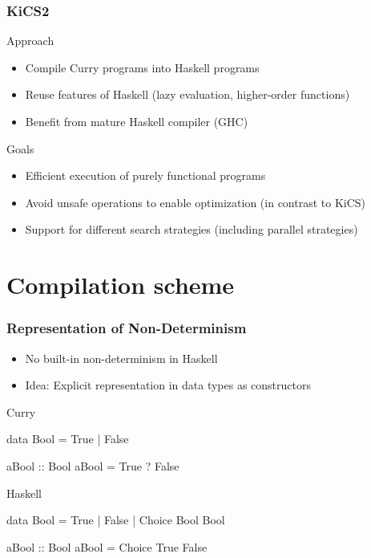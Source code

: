 \documentclass[utf8]{beamer}
\newenvironment{program}{\begin{semiverbatim}\small}{\end{semiverbatim}}
\begin{document}
\begin{frame}
\frametitle{KiCS2}
\begin{block}{Approach}
\begin{itemize}
\item Compile Curry programs into Haskell programs
\item Reuse features of Haskell (lazy evaluation, higher-order functions)
\item Benefit from mature Haskell compiler (GHC)
\end{itemize}
\end{block}
\pause
\begin{block}{Goals}
\begin{itemize}
\item Efficient execution of purely functional programs
\item Avoid unsafe operations to enable optimization (in contrast to KiCS)
\item Support for different search strategies (including parallel strategies)
\end{itemize}
\end{block}
\end{frame}

\section{Compilation scheme}

\begin{frame}[fragile]
\frametitle{Representation of Non-Determinism}
\begin{itemize}
  \item No built-in non-determinism in Haskell
  \item Idea: Explicit representation in data types as constructors
\end{itemize}
\pause
\begin{block}{Curry}
\begin{program}
data Bool = True | False

aBool :: Bool
aBool = True ? False
\end{program}
\end{block}

\begin{block}{Haskell}
\begin{program}
data Bool = True | False | Choice Bool Bool

aBool :: Bool
aBool = Choice True False
\end{program}
\end{block}
\end{frame}
\end{document}
